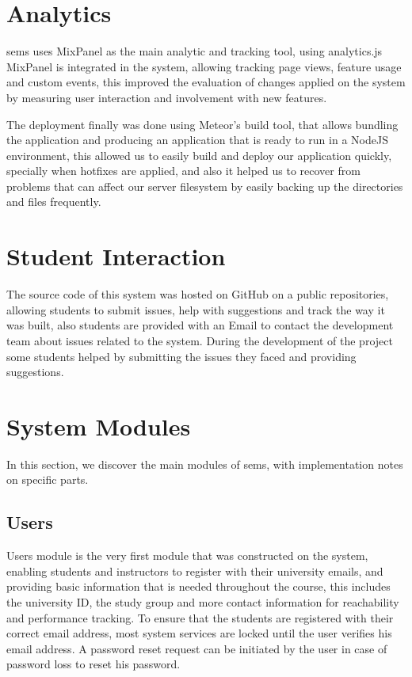 \section{Analytics}
\label{sec:analytics}

\ac{sems} uses MixPanel\texttrademark{} as the main analytic and tracking tool, using analytics.js~\cite{analytics_js} MixPanel\texttrademark{} is
integrated in the system, allowing tracking page views, feature usage and custom events, this improved the evaluation of changes applied on the
system by measuring user interaction and involvement with new features.

\newParagraph
The deployment finally was done using Meteor's build tool, that allows bundling the application and producing an application that is ready
to run in a NodeJS environment, this allowed us to easily build and deploy our application quickly, specially when hotfixes are applied,
and also it helped us to recover from problems that can affect our server filesystem by easily backing up the directories and files frequently.

\section{Student Interaction}
\label{sec:student-interaction}
The source code of this system was hosted on GitHub\texttrademark{} on a public repositories, allowing students to submit issues, help with
suggestions and track the way it was built, also students are provided with an Email to contact the development team about issues related
to the system. During the development of the project some students helped by submitting the issues they faced and providing suggestions.

\section{System Modules}
\label{sec:modules}

In this section, we discover the main modules of \ac{sems}, with implementation notes on specific parts.

\subsection{Users}
\label{sub:users}
Users module is the very first module that was constructed on the system, enabling students and instructors to register with their
university emails, and providing basic information that is needed throughout the course, this includes the university ID, the study group
and more contact information for reachability and performance tracking. To ensure that the students are registered with their correct email
address, most system services are locked until the user verifies his email address. A password reset request can be initiated by the user
in case of password loss to reset his password.

